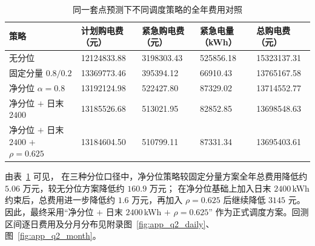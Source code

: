\begin{samepage}

\begin{table}[H]
  \centering
  \scriptsize
  \setlength{\tabcolsep}{3.2pt}
  \renewcommand{\arraystretch}{0.95}

  \caption{同一套点预测下不同调度策略的全年费用对照}
  \label{tab:q2_control}


  \begin{tabular}{lllll}
    \toprule

    \rowcolor{headerblue}
    策略
      & 计划购电费（元）
      & 紧急购电费（元）
      & 紧急电量（kWh）
      & 总购电费（元） \\

    \midrule

    无分位
      & 12124833.88
      & 3198303.43
      & 525856.18
      & 15323137.31 \\

    \rowcolor{rowblue}
    固定分量 $0.8/0.2$
      & 13369773.46
      & 395394.12
      & 66910.43
      & 13765167.58 \\

    净分位 $\alpha=0.8$
      & 13192124.98
      & 522427.80
      & 87329.02
      & 13714552.77 \\

    \midrule

    \rowcolor{rowblue}
    净分位 $+$ 日末 $2400$
      & 13185526.68
      & 513021.95
      & 82852.85
      & 13698548.63 \\

    净分位 $+$ 日末 $2400$ $+$ $\rho=0.625$
      & 13184604.50
      & 510799.11
      & 87331.34
      & 13695403.61 \\

    \bottomrule
  \end{tabular}
\end{table}

\end{samepage}

\vspace{-0.4em}

\noindent

由表~\ref{tab:q2_control} 可见，
在三种分位口径中，净分位策略较固定分量方案全年总费用降低约
$5.06$ 万元，较无分位方案降低约 $160.9$ 万元；
在净分位基础上加入日末 $2400$\,kWh 约束后，总费用进一步降低约
$1.6$ 万元，再加入 $\rho=0.625$ 后继续降低 $3145$ 元。
因此，最终采用“净分位 $+$ 日末 $2400$\,kWh $+$ $\rho=0.625$”
作为正式调度方案。回测区间逐日费用及分月分布见附录图~\ref{fig:app_q2_daily}、图~\ref{fig:app_q2_month}。


